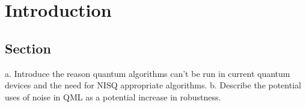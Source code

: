 \chapter{Introduction}\label{chapter:introduction}

\section{Section}
a.	Introduce the reason quantum algorithms can’t be run in current quantum devices and the need for NISQ appropriate algorithms.
b.	Describe the potential uses of noise in QML as a potential increase in robustness.
